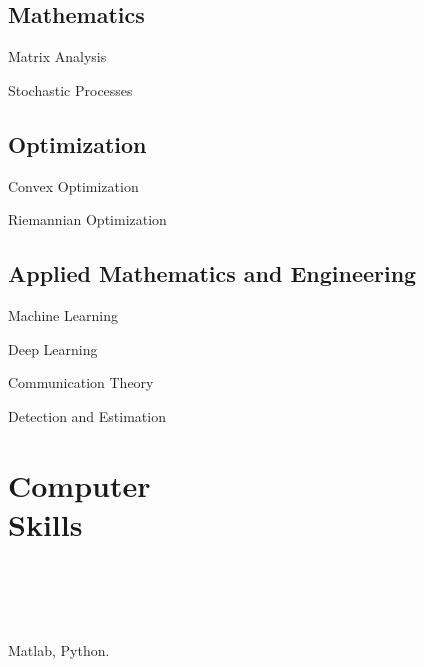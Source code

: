 \documentclass{article}
\begin{document}
\subsection*{Mathematics}
\begin{minipage}{0.28\linewidth}
 Matrix Analysis
\end{minipage} 
\begin{minipage}{0.4\linewidth}
Stochastic Processes
\end{minipage} 
\begin{minipage}{0.32\linewidth}
 
\end{minipage} 

\subsection*{Optimization} 
\begin{minipage}{0.28\linewidth}
Convex Optimization
\end{minipage}
\begin{minipage}{0.4\linewidth}
Riemannian Optimization
\end{minipage}
\begin{minipage}{0.32\linewidth}

\end{minipage}

\subsection*{Applied Mathematics and Engineering}
\begin{minipage}{0.28\linewidth}
Machine Learning
\end{minipage}
\begin{minipage}{0.20\linewidth}
Deep Learning
\end{minipage}
\begin{minipage}{0.25\linewidth}
Communication Theory
\end{minipage}
\begin{minipage}{0.25\linewidth}
Detection and Estimation
\end{minipage}



\section*{\colorbox{mygrey}{Computer Skills~~~~~~~~~~~~~~~~~~~~~~~~~~~~~~~~~~~~~~~~~~~~~~~~~~~~~~~~~~~~~~~~~~~~~~~~~~~~~~~~~~}}

Matlab,  Python.


\end{document}
